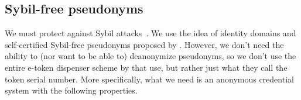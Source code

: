 \subsection{Sybil-free pseudonyms}%
\label{sybil-free-pseudonyms}

We must protect against Sybil attacks~\cite{SybilAttack}.
We use the idea of identity domains and self-certified Sybil-free pseudonyms 
proposed by \textcite{SelfCertifiedSybilFreePseudonyms}.
However, we don't need the ability to (nor want to be able to) deanonymize 
pseudonyms, so we don't use the entire e-token dispenser scheme by 
\textcite{HowToWinTheCloneWars} that 
\textcite{SelfCertifiedSybilFreePseudonyms} use, but rather just what they call 
the token serial number.
More specifically, what we need is an anonymous credential system with the 
following properties.


